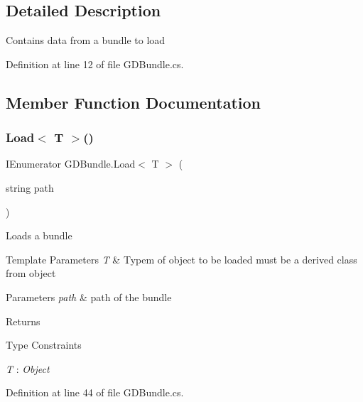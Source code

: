 \subsection{Detailed Description}
Contains data from a bundle to load 

Definition at line 12 of file G\+D\+Bundle.\+cs.



\subsection{Member Function Documentation}
\mbox{\label{class_g_d_bundle_a562d36344ca9dd6199c574b16d84a746}} 
\subsubsection{Load$<$ T $>$()}
{\footnotesize\ttfamily I\+Enumerator G\+D\+Bundle.\+Load$<$ T $>$ (\begin{DoxyParamCaption}\item[{string}]{path }\end{DoxyParamCaption})}



Loads a bundle 


\begin{DoxyTemplParams}{Template Parameters}
{\em T} & Typem of object to be loaded must be a derived class from object\\
\hline
\end{DoxyTemplParams}

\begin{DoxyParams}{Parameters}
{\em path} & path of the bundle\\
\hline
\end{DoxyParams}
\begin{DoxyReturn}{Returns}

\end{DoxyReturn}
\begin{Desc}
\item[Type Constraints]\begin{description}
\item[{\em T} : {\em Object}]\end{description}
\end{Desc}


Definition at line 44 of file G\+D\+Bundle.\+cs.

\mbox{\label{class_g_d_bundle_a6308d9f58b9ca93e278d179d7dbd60ad}} 
